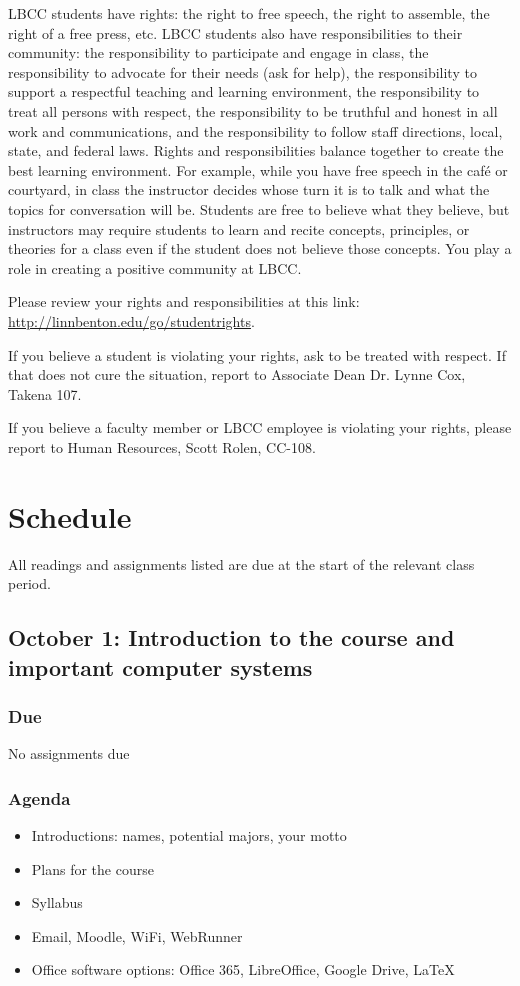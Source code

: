 \documentclass[12pt,article,oneside]{memoir}
\begin{document}
LBCC students have rights: the right to free speech, the right to assemble, the right of a free press, etc. LBCC students also have responsibilities to their community: the responsibility to participate and engage in class, the responsibility to advocate for their needs (ask for help), the responsibility to support a respectful teaching and learning environment, the responsibility to treat all persons with respect, the responsibility to be truthful and honest in all work and communications, and the responsibility to follow staff directions, local, state, and federal laws. Rights and responsibilities balance together to create the best learning environment. For example, while you have free speech in the caf\'{e} or courtyard, in class the instructor decides whose turn it is to talk and what the topics for conversation will be. Students are free to believe what they believe, but instructors may require students to learn and recite concepts, principles, or theories for a class even if the student does not believe those concepts. You play a role in creating a positive community at LBCC. 

Please review your rights and responsibilities at this link: \url{http://linnbenton.edu/go/studentrights}.

If you believe a student is violating your rights, ask to be treated with respect. If that does not cure the situation, report to Associate Dean Dr. Lynne Cox, Takena 107.

If you believe a faculty member or LBCC employee is violating your rights, please report to Human Resources, Scott Rolen, CC-108.

\newpage

\section{Schedule}

All readings and assignments listed are due at the start of the relevant class period.

\subsection{October 1: Introduction to the course and important computer systems}

\subsubsection{Due}
No assignments due

\subsubsection{Agenda}
\begin{itemize}
 \item Introductions: names, potential majors, your motto
 \item Plans for the course
 \item Syllabus
 \item Email, Moodle, WiFi, WebRunner
 \item Office software options: Office 365, LibreOffice, Google Drive, \LaTeX
\end{itemize}
\end{document}
